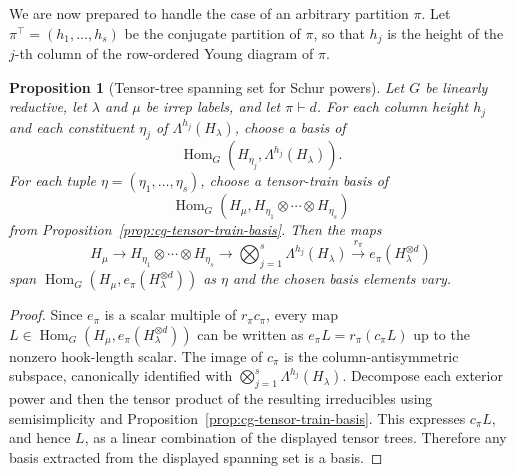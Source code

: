 \documentclass[11pt]{article}
\newcommand{\HomG}[2]{\operatorname{Hom}_G\!\left(#1,#2\right)}
\newtheorem{proposition}[theorem]{Proposition}
\theoremstyle{definition}
\begin{document}
We are now prepared to handle the case of an arbitrary partition $\pi$.
Let $\pi^\top=(h_1,\dots,h_s)$ be the conjugate partition of $\pi$, so that $h_j$ is the height of the $j$-th column of the row-ordered Young diagram of $\pi$.

\begin{proposition}[Tensor-tree spanning set for Schur powers]\label{prop:general-schur-tree-spanning}
  Let $G$ be linearly reductive, let $\lambda$ and $\mu$ be irrep labels, and let $\pi\vdash d$.
  For each column height $h_j$ and each constituent $\eta_j$ of $\Lambda^{h_j}(H_\lambda)$, choose a basis of
  \[
    \HomG{H_{\eta_j}}{\Lambda^{h_j}(H_\lambda)}.
  \]
  For each tuple $\eta=(\eta_1,\dots,\eta_s)$, choose a tensor-train basis of
  \[
    \HomG{H_\mu}{H_{\eta_1}\otimes\cdots\otimes H_{\eta_s}}
  \]
  from Proposition~\ref{prop:cg-tensor-train-basis}.
  Then the maps
  \[
    H_\mu
    \longrightarrow
    H_{\eta_1}\otimes\cdots\otimes H_{\eta_s}
    \longrightarrow
    \bigotimes_{j=1}^s \Lambda^{h_j}(H_\lambda)
    \xrightarrow{\ r_\pi\ }
    e_\pi(H_\lambda^{\otimes d})
  \]
  span $\HomG{H_\mu}{e_\pi(H_\lambda^{\otimes d})}$ as $\eta$ and the chosen basis elements vary.
\end{proposition}
\begin{proof}
  Since $e_\pi$ is a scalar multiple of $r_\pi c_\pi$, every map $L\in\HomG{H_\mu}{e_\pi(H_\lambda^{\otimes d})}$ can be written as $e_\pi L=r_\pi(c_\pi L)$ up to the nonzero hook-length scalar.
  The image of $c_\pi$ is the column-antisymmetric subspace, canonically identified with $\bigotimes_{j=1}^s\Lambda^{h_j}(H_\lambda)$.
  Decompose each exterior power and then the tensor product of the resulting irreducibles using semisimplicity and Proposition~\ref{prop:cg-tensor-train-basis}.
  This expresses $c_\pi L$, and hence $L$, as a linear combination of the displayed tensor trees.
  Therefore any basis extracted from the displayed spanning set is a basis.
\end{proof}
\end{document}
